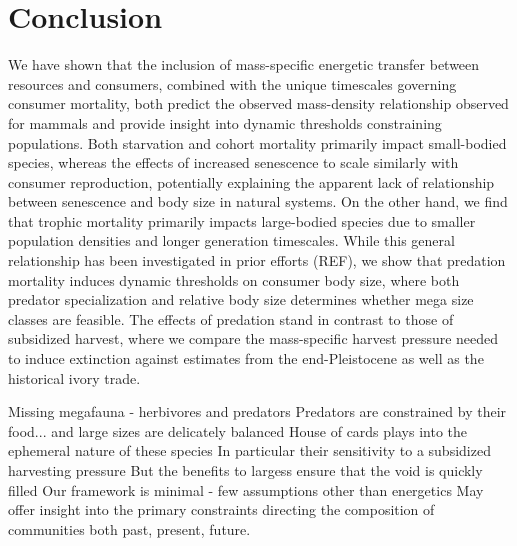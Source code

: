 \documentclass[11pt]{article}
\begin{document}
\section*{Conclusion}
We have shown that the inclusion of mass-specific energetic transfer between resources and consumers, combined with the unique timescales governing consumer mortality, both predict the observed mass-density relationship observed for mammals \citep{Damuth1987} and provide insight into dynamic thresholds constraining populations.
Both starvation and cohort mortality primarily impact small-bodied species, whereas the effects of increased senescence to scale similarly with consumer reproduction, potentially explaining the apparent lack of relationship between senescence and body size in natural systems.
On the other hand, we find that trophic mortality primarily impacts large-bodied species due to smaller population densities and longer generation timescales.
While this general relationship has been investigated in prior efforts (REF), we show that predation mortality induces dynamic thresholds on consumer body size, where both predator specialization and relative body size determines whether mega size classes are feasible.
The effects of predation stand in contrast to those of subsidized harvest, where we compare the mass-specific harvest pressure needed to induce extinction against estimates from the end-Pleistocene as well as the historical ivory trade.

Missing megafauna - herbivores and predators
Predators are constrained by their food... and large sizes are delicately balanced
House of cards plays into the ephemeral nature of these species
In particular their sensitivity to a subsidized harvesting pressure
But the benefits to largess ensure that the void is quickly filled
Our framework is minimal - few assumptions other than energetics
May offer insight into the primary constraints directing the composition of communities both past, present, future.




\end{document}
